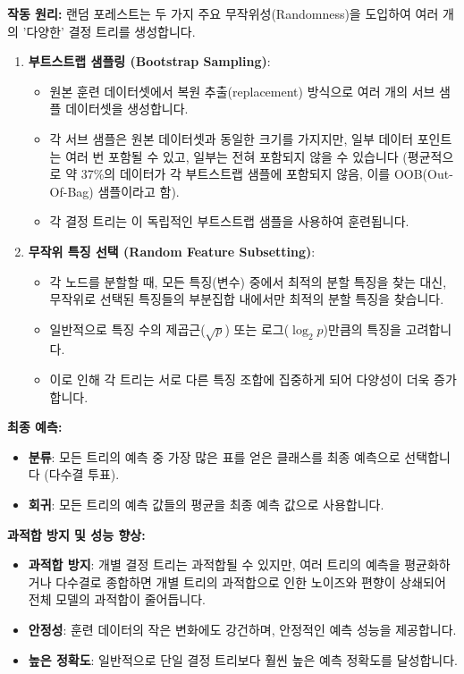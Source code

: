 \documentclass[11pt,a4paper]{article}
\theoremstyle{definition}
\begin{document}
\textbf{작동 원리:}
랜덤 포레스트는 두 가지 주요 무작위성(Randomness)을 도입하여 여러 개의 '다양한' 결정 트리를 생성합니다.
\begin{enumerate}
    \item \textbf{부트스트랩 샘플링 (Bootstrap Sampling)}:
        \begin{itemize}
            \item 원본 훈련 데이터셋에서 복원 추출(replacement) 방식으로 여러 개의 서브 샘플 데이터셋을 생성합니다.
            \item 각 서브 샘플은 원본 데이터셋과 동일한 크기를 가지지만, 일부 데이터 포인트는 여러 번 포함될 수 있고, 일부는 전혀 포함되지 않을 수 있습니다 (평균적으로 약 37\%의 데이터가 각 부트스트랩 샘플에 포함되지 않음, 이를 OOB(Out-Of-Bag) 샘플이라고 함).
            \item 각 결정 트리는 이 독립적인 부트스트랩 샘플을 사용하여 훈련됩니다.
        \end{itemize}
    \item \textbf{무작위 특징 선택 (Random Feature Subsetting)}:
        \begin{itemize}
            \item 각 노드를 분할할 때, 모든 특징(변수) 중에서 최적의 분할 특징을 찾는 대신, 무작위로 선택된 특징들의 부분집합 내에서만 최적의 분할 특징을 찾습니다.
            \item 일반적으로 특징 수의 제곱근($\sqrt{p}$) 또는 로그($\log_2 p$)만큼의 특징을 고려합니다.
            \item 이로 인해 각 트리는 서로 다른 특징 조합에 집중하게 되어 다양성이 더욱 증가합니다.
        \end{itemize}
\end{enumerate}

\textbf{최종 예측:}
\begin{itemize}
    \item \textbf{분류}: 모든 트리의 예측 중 가장 많은 표를 얻은 클래스를 최종 예측으로 선택합니다 (다수결 투표).
    \item \textbf{회귀}: 모든 트리의 예측 값들의 평균을 최종 예측 값으로 사용합니다.
\end{itemize}

\textbf{과적합 방지 및 성능 향상:}
\begin{itemize}
    \item \textbf{과적합 방지}: 개별 결정 트리는 과적합될 수 있지만, 여러 트리의 예측을 평균화하거나 다수결로 종합하면 개별 트리의 과적합으로 인한 노이즈와 편향이 상쇄되어 전체 모델의 과적합이 줄어듭니다.
    \item \textbf{안정성}: 훈련 데이터의 작은 변화에도 강건하며, 안정적인 예측 성능을 제공합니다.
    \item \textbf{높은 정확도}: 일반적으로 단일 결정 트리보다 훨씬 높은 예측 정확도를 달성합니다.
\end{itemize}
\end{document}
